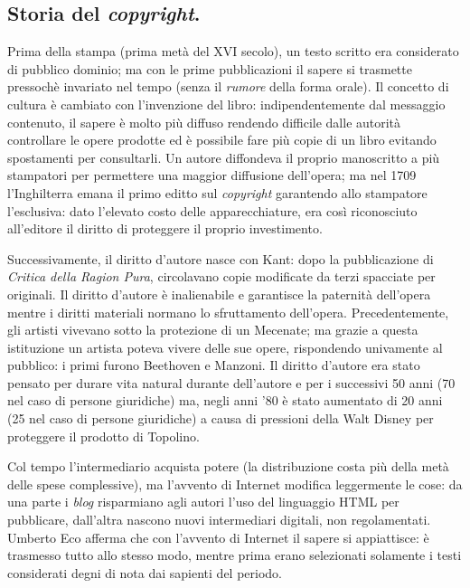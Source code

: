 \documentclass[a4page, 11pt, twocolumn]{article}
\begin{document}
\subsection{Storia del \textit{copyright}.}
Prima della stampa (prima metà del XVI secolo), un testo scritto era considerato di pubblico dominio; ma con le prime pubblicazioni il sapere si trasmette pressochè invariato nel tempo (senza il \textit{rumore} della forma orale).
Il concetto di cultura è cambiato con l'invenzione del libro: indipendentemente dal messaggio contenuto, il sapere è molto più diffuso rendendo difficile dalle autorità controllare le opere prodotte ed è possibile fare più copie di un libro evitando spostamenti per consultarli.
Un autore diffondeva il proprio manoscritto a più stampatori per permettere una maggior diffusione dell'opera; ma nel 1709 l'Inghilterra emana il primo editto sul \textit{copyright} garantendo allo stampatore l'esclusiva: dato l'elevato costo delle apparecchiature, era così riconosciuto all'editore il diritto di proteggere il proprio investimento.

Successivamente, il diritto d'autore nasce con Kant: dopo la pubblicazione di \textit{Critica della Ragion Pura}, circolavano copie modificate da terzi spacciate per originali.
Il diritto d'autore è inalienabile e garantisce la paternità dell'opera mentre i diritti materiali normano lo sfruttamento dell'opera. \newline
Precedentemente, gli artisti vivevano sotto la protezione di un Mecenate; ma grazie a questa istituzione un artista poteva vivere delle sue opere, rispondendo univamente al pubblico: i primi furono Beethoven e Manzoni.
Il diritto d'autore era stato pensato per durare vita natural durante dell'autore e per i successivi 50 anni (70 nel caso di persone giuridiche) ma, negli anni '80 è stato aumentato di 20 anni (25 nel caso di persone giuridiche) a causa di pressioni della Walt Disney per proteggere il prodotto di Topolino.

Col tempo l'intermediario acquista potere (la distribuzione costa più della metà delle spese complessive), ma l'avvento di Internet modifica leggermente le cose: da una parte i \textit{blog} risparmiano agli autori l'uso del linguaggio HTML per pubblicare, dall'altra nascono nuovi intermediari digitali, non regolamentati.
Umberto Eco afferma che con l'avvento di Internet il sapere si appiattisce: è trasmesso tutto allo stesso modo, mentre prima erano selezionati solamente i testi considerati degni di nota dai sapienti del periodo.
\end{document}
